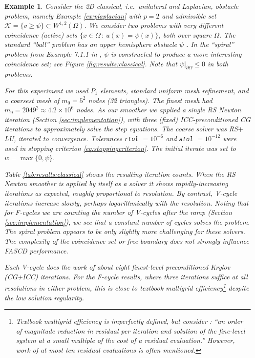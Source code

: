 \documentclass[letterpaper,final,12pt,reqno]{amsart}
\theoremstyle{cstyle}
\theoremstyle{cstyle*}
\theoremstyle{dstyle}
\newtheorem{example}[theorem]{Example}
\numberwithin{equation}{section}
\numberwithin{figure}{section}
\numberwithin{table}{section}
\numberwithin{theorem}{section}
\begin{document}
\begin{example} \label{ex:results:classical}
Consider the 2D classical, i.e.~unilateral and Laplacian, obstacle problem, namely Example \ref{ex:plaplacian} with $p=2$ and admissible set $\mathcal{K} = \{v \ge \psi\} \subset W^{1,2}(\Omega)$.  We consider two problems with very different coincidence (active) sets $\{x\in\Omega \,:\, u(x)=\psi(x)\}$, both over square $\Omega$.   The standard ``ball'' problem has an upper hemisphere obstacle $\psi$ \cite[Chapter 12]{Bueler2021}.  In the ``spiral'' problem from Example 7.1.1 in \cite{GraeserKornhuber2009}, $\psi$ is constructed to produce a more interesting coincidence set; see Figure \ref{fig:results:classical}.  Note that $\psi\big|_{\partial \Omega} \le 0$ in both problems.

For this experiment we used $P_1$ elements, standard uniform mesh refinement, and a coarsest mesh of $m_0=5^2$ nodes (32 triangles).  The finest mesh had $m_9=2049^2 \approx 4.2 \times 10^{6}$ nodes.  As our smoother we applied a single RS Newton iteration (Section \ref{sec:implementation}), with three (fixed) ICC-preconditioned CG iterations to approximately solve the step equations.  The coarse solver was RS$+$LU, iterated to convergence.  Tolerances \texttt{rtol} $= 10^{-6}$ and \texttt{atol} $= 10^{-12}$ were used in stopping criterion \eqref{eq:stoppingcriterion}.  The initial iterate was set to $w=\max\{0,\psi\}$.

Table \ref{tab:results:classical} shows the resulting iteration counts.  When the RS Newton smoother is applied by itself as a solver it shows rapidly-increasing iterations as expected, roughly proportional to resolution.  By contrast, V-cycle iterations increase slowly, perhaps logarithmically with the resolution.  Noting that for F-cycles we are counting the number of V-cycles after the ramp (Section \ref{sec:implementation}), we see that a constant number of cycles solves the problem.  The spiral problem appears to be only slightly more challenging for these solvers.  The complexity of the coincidence set or free boundary does not strongly-influence FASCD performance.

Each V-cycle does the work of about eight finest-level preconditioned Krylov (CG+ICC) iterations.  For the F-cycle results, where three iterations suffice at all resolutions in either problem, this is close to textbook multigrid efficiency\footnote{Textbook multigrid efficiency is imperfectly defined, but consider \cite{BrownSmithAhmadia2013}: ``an order of magnitude reduction in residual per iteration and solution of the fine-level system at a small multiple of the cost of a residual evaluation.''  However, work of at most ten residual evaluations is often mentioned.} despite the low solution regularity.
\end{example}
\end{document}
